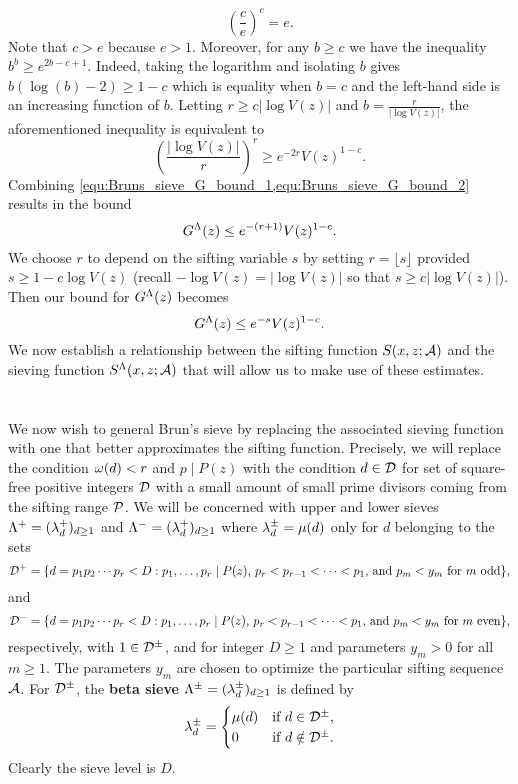 \documentclass[12pt,oneside]{book}
\begin{document}
    \[
      \left(\frac{c}{e}\right)^{c} = e.
    \]
    Note that $c > e$ because $e > 1$. Moreover, for any $b \ge c$ we have the inequality $b^{b} \ge e^{2b-c+1}$. Indeed, taking the logarithm and isolating $b$ gives $b(\log(b)-2) \ge 1-c$ which is equality when $b = c$ and the left-hand side is an increasing function of $b$. Letting $r \ge c|\log V(z)|$ and $b = \frac{r}{|\log V(z)|}$, the aforementioned inequality is equivalent to
    \begin{equation}\label{equ:Bruns_sieve_G_bound_2}
      \left(\frac{|\log V(z)|}{r}\right)^{r} \ge e^{-2r}V(z)^{1-c}.
    \end{equation}
    Combining \cref{equ:Bruns_sieve_G_bound_1,equ:Bruns_sieve_G_bound_2} results in the bound
    \[
      G^{\Lambda}(z) \le e^{-(r+1)}V(z)^{1-c}.
    \]
    We choose $r$ to depend on the sifting variable $s$ by setting $r = \lfloor s \rfloor$ provided $s \ge 1-c\log V(z)$ (recall $-\log V(z) = |\log V(z)|$ so that $s \ge c|\log V(z)|$). Then our bound for $G^{\Lambda}(z)$ becomes
    \[
      G^{\Lambda}(z) \le e^{-s}V(z)^{1-c}.
    \]
    We now establish a relationship between the sifting function $S(x,z;\mathcal{A})$ and the sieving function $S^{\Lambda}(x,z;\mathcal{A})$ that will allow us to make use of these estimates. 
  \section{}
    We now wish to general Brun's sieve by replacing the associated sieving function with one that better approximates the sifting function. Precisely, we will replace the condition $\omega(d) < r$ and $p \mid P(z)$ with the condition $d \in \mathcal{D}$ for set of square-free positive integers $\mathcal{D}$ with a small amount of small prime divisors coming from the sifting range $\mathcal{P}$. We will be concerned with upper and lower sieves $\Lambda^{+} = (\lambda_{d}^{+})_{d \ge 1}$ and $\Lambda^{-} = (\lambda_{d}^{+})_{d \ge 1}$ where $\lambda_{d}^{\pm} = \mu(d)$ only for $d$ belonging to the sets
    \[
      \mathcal{D}^{+} = \{d = p_{1}p_{2} \cdots p_{r} < D:\text{$p_{1},\ldots,p_{r} \mid P(z)$, $p_{r} < p_{r-1} < \cdots < p_{1}$, and $p_{m} < y_{m}$ for $m$ odd}\},
    \]
    and
    \[
      \mathcal{D}^{-} = \{d = p_{1}p_{2} \cdots p_{r} < D:\text{$p_{1},\ldots,p_{r} \mid P(z)$, $p_{r} < p_{r-1} < \cdots < p_{1}$, and $p_{m} < y_{m}$ for $m$ even}\},
    \]
    respectively, with $1 \in \mathcal{D}^{\pm}$, and for integer $D \ge 1$ and parameters $y_{m} > 0$ for all $m \ge 1$. The parameters $y_{m}$ are chosen to optimize the particular sifting sequence $\mathcal{A}$. For $\mathcal{D}^{\pm}$, the \textbf{beta sieve} $\Lambda^{\pm} = (\lambda_{d}^{\pm})_{d \ge 1}$ is defined by
    \[
      \lambda_{d}^{\pm} = \begin{cases} \mu(d) & \text{if $d \in \mathcal{D}^{\pm}$}, \\ 0 & \text{if $d \notin \mathcal{D}^{\pm}$}. \end{cases}
    \]
    Clearly the sieve level is $D$. 
    
\end{document}
